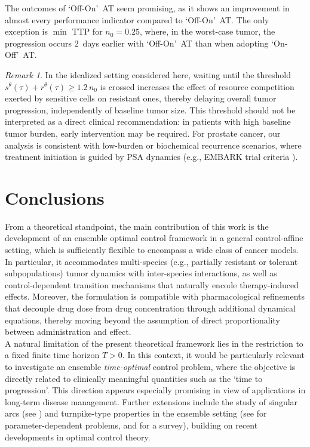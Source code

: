 \documentclass[a4paper,12pt, reqno]{amsart}
\theoremstyle{plain}
\theoremstyle{definition}
\theoremstyle{remark}
\newtheorem{remark}{Remark}
\numberwithin{equation}{section}
\begin{document}
\noindent
The outcomes of `Off-On'~AT seem promising, as it shows an improvement in almost every performance indicator compared to `Off-On'~AT. The only exception is $\min$ TTP for $n_0=0.25$, where, in the worst-case tumor, the progression occurs $2$~days earlier with `Off-On'~AT than when adopting `On-Off'~AT.
{
\begin{remark} \label{rmk:delay_rationale}
In the idealized setting considered here, waiting until the threshold $s^\theta(\tau)+r^\theta(\tau)\geq 1.2\, n_0$  is crossed increases the effect of resource competition exerted by sensitive cells on resistant ones, thereby delaying overall tumor progression, independently of baseline tumor size. 
This threshold should not be interpreted as a direct clinical recommendation: in patients with high baseline tumor burden, early intervention may be required. 
For prostate cancer, our analysis is consistent with low-burden or biochemical recurrence scenarios, where treatment initiation is guided by PSA dynamics (e.g., EMBARK trial criteria \cite{Freedland2023}).
\end{remark}
}


\section*{Conclusions}


From a theoretical standpoint, the main contribution of this work is the development of an ensemble optimal control framework in a general control-affine setting, which is sufficiently flexible to encompass a wide class of cancer models. 
In particular, it accommodates multi-species (e.g., partially resistant or tolerant sub\-populations) tumor dynamics with inter-species interactions, as well as control-dependent transition mechanisms that naturally encode therapy-induced effects.
Moreover, the formulation is compatible with pharmacological refinements that decouple drug dose from drug concentration through additional dynamical equations, thereby moving beyond the assumption of direct proportionality between administration and effect.\\
A natural limitation of the present theoretical framework lies in the restriction to a fixed finite time horizon $T>0$. In this context, it would be particularly relevant to investigate an ensemble \emph{time-optimal} control problem, where the objective is directly related to clinically meaningful quantities such as the `time to progression'. 
This direction appears especially promising in view of applications in long-term disease management. Further extensions include the study of singular arcs (see \cite{aronna2025singular}) and turnpike-type properties in the ensemble setting (see \cite{hernandez2024averaged} for parameter-dependent problems, and \cite{trelat2025turnpike} for a survey), building on recent developments in optimal control theory.
\end{document}
